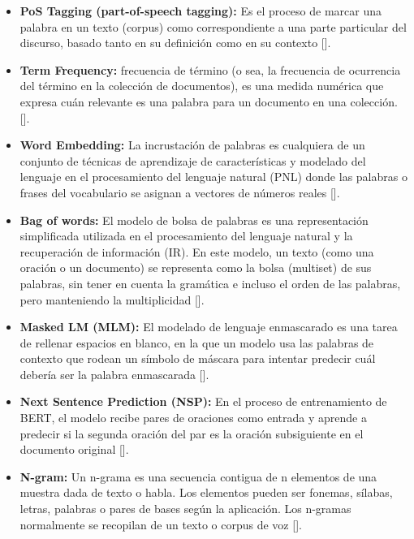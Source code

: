 \documentclass[../Main.tex]{subfiles}
\begin{document}
\begin{itemize}
    \item \textbf{PoS Tagging (part-of-speech tagging):} Es el proceso de marcar una palabra en un texto (corpus) como correspondiente a una parte particular del discurso, basado tanto en su definición como en su contexto [].  \par
    
    \item \textbf{Term Frequency:} frecuencia de término (o sea, la frecuencia de ocurrencia del término en la colección de documentos), es una medida numérica que expresa cuán relevante es una palabra para un documento en una colección. []. \par
    
    \item \textbf{Word Embedding:} La incrustación de palabras es cualquiera de un conjunto de técnicas de aprendizaje de características y modelado del lenguaje en el procesamiento del lenguaje natural (PNL) donde las palabras o frases del vocabulario se asignan a vectores de números reales []. \par
    
    \item \textbf{Bag of words:} El modelo de bolsa de palabras es una representación simplificada utilizada en el procesamiento del lenguaje natural y la recuperación de información (IR). En este modelo, un texto (como una oración o un documento) se representa como la bolsa (multiset) de sus palabras, sin tener en cuenta la gramática e incluso el orden de las palabras, pero manteniendo la multiplicidad []. \par
    
    \item \textbf{Masked LM (MLM):} El modelado de lenguaje enmascarado es una tarea de rellenar espacios en blanco, en la que un modelo usa las palabras de contexto que rodean un símbolo de máscara para intentar predecir cuál debería ser la palabra enmascarada []. \par
    
    \item \textbf{Next Sentence Prediction (NSP):} En el proceso de entrenamiento de BERT, el modelo recibe pares de oraciones como entrada y aprende a predecir si la segunda oración del par es la oración subsiguiente en el documento original []. \par
    
    \item \textbf{N-gram:} Un n-grama es una secuencia contigua de n elementos de una muestra dada de texto o habla. Los elementos pueden ser fonemas, sílabas, letras, palabras o pares de bases según la aplicación. Los n-gramas normalmente se recopilan de un texto o corpus de voz []. \par
    

\end{itemize}
\end{document}
